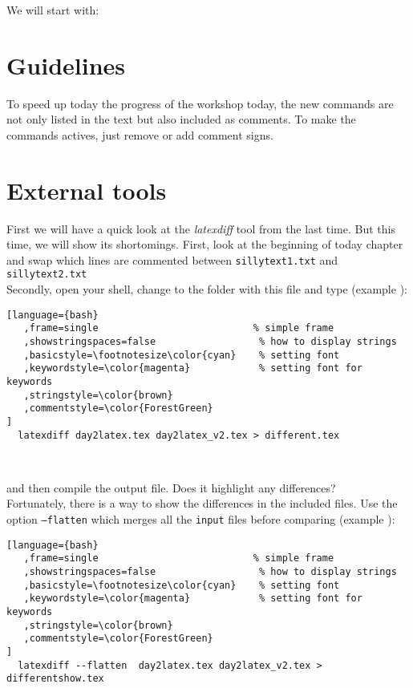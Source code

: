 \documentclass[a4paper,10pt]{report} %
\newcounter{samplecode}[chapter]
\begin{document}
We will start with:
  
%

\section{Guidelines}
To speed up today the progress of the workshop today, the new commands are not only listed in the text but also included as comments. To make the commands actives, just remove or add comment signs.

\section{External tools}
First we will have a quick look at the \emph{latexdiff} tool from the last time.
But this time, we will  show its shortomings. First, look at the beginning of today chapter and swap which lines are commented between  \texttt{sillytext1.txt} and \texttt{sillytext2.txt}\\

Secondly, open your shell, change to the folder with this file and type  (example ): 

\begin{lstlisting}[language={bash}
   ,frame=single                           % simple frame 
   ,showstringspaces=false                  % how to display strings
   ,basicstyle=\footnotesize\color{cyan}    % setting font
   ,keywordstyle=\color{magenta}            % setting font for keywords 
   ,stringstyle=\color{brown}
   ,commentstyle=\color{ForestGreen} 
]
  latexdiff day2latex.tex day2latex_v2.tex > different.tex
\end{lstlisting}~\vspace{1ex}

and then compile the output file. Does it highlight any differences?\\

Fortunately, there is a way to show the differences in the included files. Use the option \texttt{--flatten} which merges all the \texttt{input} files before comparing  (example ):
\begin{lstlisting}[language={bash}
   ,frame=single                           % simple frame 
   ,showstringspaces=false                  % how to display strings
   ,basicstyle=\footnotesize\color{cyan}    % setting font
   ,keywordstyle=\color{magenta}            % setting font for keywords 
   ,stringstyle=\color{brown}
   ,commentstyle=\color{ForestGreen} 
]
  latexdiff --flatten  day2latex.tex day2latex_v2.tex > differentshow.tex
\end{lstlisting}~\vspace{1ex}
\end{document}
